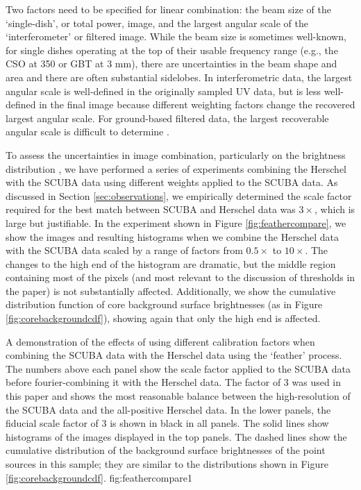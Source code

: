 \documentclass[twocolumn]{aastex61}
\begin{document}
Two factors need to be specified for linear combination: the beam size of the
`single-dish', or total power, image, and the largest angular scale of the
`interferometer' or filtered image.  While the beam size is sometimes
well-known, for single dishes operating at the top of their usable frequency
range (e.g., the CSO at 350 \um or GBT at 3 mm), there are uncertainties in the
beam shape and area and there are often substantial sidelobes.  In
interferometric data, the largest angular scale is well-defined in the
originally sampled UV data, but is less well-defined in the final image because
different weighting factors change the recovered largest angular scale.  For
ground-based filtered data, the largest recoverable angular scale is difficult
to determine 
\citep[e.g.,][]{Ginsburg2013a,Chapin2013a}.

To assess the uncertainties in image combination, particularly on the
brightness distribution \citep[e.g.,][]{Ossenkopf-Okada2016a}, we have performed
a series of experiments combining the Herschel with the SCUBA data using
different weights applied to the SCUBA data.  As discussed in Section
\ref{sec:observations}, we empirically determined the scale factor required for
the best match between SCUBA and Herschel data was $3\times$, which is
 large but justifiable.  In the experiment shown in Figure
\ref{fig:feathercompare}, we show the images and resulting histograms when we
combine the Herschel data with the SCUBA data scaled by a range of factors from
$0.5\times$ to $10\times$.  The changes to the high end of the histogram are
dramatic, but the middle region containing most of the pixels (and most
relevant to the discussion of thresholds in the paper) is not substantially affected.
Additionally, we show the cumulative distribution function of core background
surface brightnesses (as in Figure \ref{fig:corebackgroundcdf}), showing again
that only the high end is affected. 

{A demonstration of the effects of using different calibration factors when
combining the SCUBA data with the Herschel data using the `feather' process.
The numbers above each panel show the scale factor applied to the SCUBA data
before fourier-combining it with the Herschel data.  The factor of 3 was used
in this paper and shows the most reasonable balance between the high-resolution
of the SCUBA data and the all-positive Herschel data.  In the lower panels, the
fiducial scale factor of 3 is shown in black in all panels.  The solid lines
show histograms of the images displayed in the top panels.  The dashed lines
show the cumulative distribution of the background surface brightnesses of the
point sources in this sample; they are similar to the distributions shown in
Figure \ref{fig:corebackgroundcdf}.}
{fig:feathercompare}{1}{\textwidth}
\end{document}
